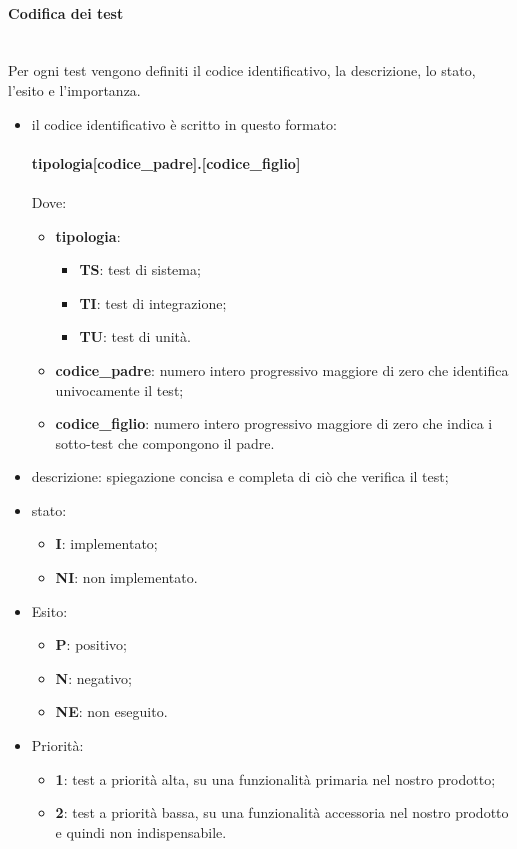 \paragraph*{Codifica dei test} \mbox{} \\ [1mm]
Per ogni test vengono definiti il codice identificativo, la descrizione, lo stato, l'esito e l'importanza.
\begin{itemize}
	\item il codice identificativo è scritto in questo formato:\\
	\\ \textbf{tipologia[codice\_padre].[codice\_figlio]} \\
	\\ Dove:
	\begin{itemize}
		\item \textbf{tipologia}:
		\begin{itemize}
			\item \textbf{TS}: test di sistema;
			\item \textbf{TI}: test di integrazione;
			\item \textbf{TU}: test di unità.
		\end{itemize}
		\item \textbf{codice\_padre}: numero intero progressivo maggiore di zero che identifica univocamente il test;
		\item \textbf{codice\_figlio}: numero intero progressivo maggiore di zero che indica i sotto-test che compongono il padre.
	\end{itemize}
	\item descrizione: spiegazione concisa e completa di ciò che verifica il test;
	\item stato:
	\begin{itemize}
		\item \textbf{I}: implementato;
		\item \textbf{NI}: non implementato.
	\end{itemize}
	\item Esito:
	\begin{itemize}
		\item \textbf{P}: positivo;
		\item \textbf{N}: negativo;
		\item \textbf{NE}: non eseguito.
	\end{itemize}
	\item Priorità:
	\begin{itemize}
		\item \textbf{1}: test a priorità alta, su una funzionalità primaria nel nostro prodotto;
		\item \textbf{2}: test a priorità bassa, su una funzionalità accessoria nel nostro prodotto e quindi non indispensabile.
	\end{itemize}
\end{itemize}

